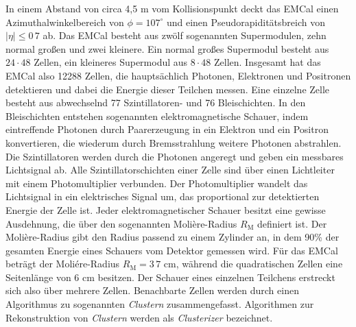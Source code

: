 In einem Abstand von circa 4,5 m vom Kollisionspunkt deckt das EMCal einen Azimuthalwinkelbereich von $\phi=107^{\circ}$ und einen Pseudorapiditätsbreich von $ |\eta| \leq 0\,7$ ab.
Das EMCal besteht aus zwölf sogenannten Supermodulen, zehn normal großen und zwei kleinere.
Ein normal großes Supermodul besteht aus $24\cdot48$ Zellen, ein kleineres Supermodul aus $8\cdot48$ Zellen.
Insgesamt hat das EMCal also 12288 Zellen, die hauptsächlich Photonen, Elektronen und Positronen detektieren und dabei die Energie dieser Teilchen messen.
Eine einzelne Zelle besteht aus abwechselnd 77 Szintillatoren- und 76 Bleischichten.
In den Bleischichten entstehen sogenannten elektromagnetische Schauer, indem eintreffende Photonen durch Paarerzeugung in ein Elektron und ein Positron konvertieren, die wiederum durch Bremsstrahlung weitere Photonen abstrahlen.
Die Szintillatoren werden durch die Photonen angeregt und geben ein messbares Lichtsignal ab.
Alle Szintillatorschichten einer Zelle sind über einen Lichtleiter mit einem Photomultiplier verbunden.
Der Photomultiplier wandelt das Lichtsignal in ein elektrisches Signal um, das proportional zur detektierten Energie der Zelle ist.
\newline
Jeder elektromagnetischer Schauer besitzt eine gewisse Ausdehnung, die über den sogenannten Moli\`ere-Radius $R_{\text{M}}$ definiert ist.
Der Moli\`ere-Radius gibt den Radius passend zu einem Zylinder an, in dem 90\% der gesamten Energie eines Schauers vom Detektor gemessen wird.
Für das EMCal beträgt der Moliére-Radius $R_{\text{M}} = 3\,7$ cm, während die quadratischen Zellen eine Seitenlänge von 6 cm besitzen. 
Der Schauer eines einzelnen Teilchens erstreckt sich also über mehrere Zellen.
Benachbarte Zellen werden durch einen Algorithmus zu sogenannten \textit{Clustern} zusammengefasst.
Algorithmen zur Rekonstruktion von \textit{Clustern} werden als \textit{Clusterizer} bezeichnet.

